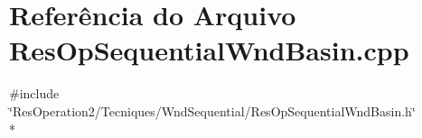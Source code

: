 \section{Referência do Arquivo Res\+Op\+Sequential\+Wnd\+Basin.\+cpp}
\label{_res_op_sequential_wnd_basin_8cpp}
{\ttfamily \#include \char`\"{}Res\+Operation2/\+Tecniques/\+Wnd\+Sequential/\+Res\+Op\+Sequential\+Wnd\+Basin.\+h\char`\"{}}\\*
